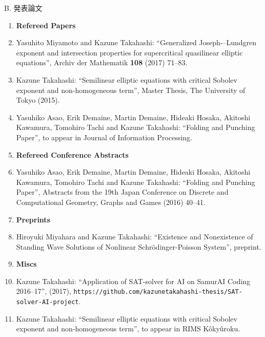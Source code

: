 \documentclass[a4j,twocolumn]{jarticle}
\begin{document}
\vspace{0.2cm}

\noindent B. 発表論文

\vspace{0.1cm}


\begin{enumerate}
 \item[] {\bf Refereed Papers}
 \item Yasuhito Miyamoto and Kazune Takahashi: ``Generalized
       Joseph-–Lundgren exponent and intersection properties for
       supercritical quasilinear elliptic equations'',
       Archiv der Mathematik {\bf 108} (2017) 71--83. 
 \item Kazune Takahashi: ``Semilinear elliptic equations with critical
       Sobolev exponent and non-homogeneous term'',
       Master Thesis, The University of Tokyo (2015).
 \item Yasuhiko Asao, Erik Demaine, Martin Demaine, Hideaki Hosaka,
       Akitoshi Kawamura, Tomohiro Tachi and Kazune Takahashi:
       ``Folding and Punching Paper'', to appear in
       Journal of Information Processing.
 \item[] {\bf Refereed Conference Abstracts}
 \item Yasuhiko Asao, Erik Demaine, Martin Demaine, Hideaki Hosaka,
       Akitoshi Kawamura, Tomohiro Tachi and Kazune Takahashi:
       ``Folding and Punching Paper'', Abstracts from the 19th Japan
       Conference on Discrete and Computational Geometry, Graphs and
       Games (2016) 40--41.
 \item[] {\bf Preprints}
 \item Hiroyuki Miyahara and Kazune Takahashi: ``Existence and
       Nonexistence of Standing Wave Solutions of 
       Nonlinear Schr\"{o}dinger-Poisson System'', preprint.
 \item[] {\bf Miscs}
 \item Kazune Takahashi: ``Application of SAT-solver for AI on SamurAI
       Coding 2016--17'', (2017),
       {\tt https:\slash\slash{}github.com\slash{}kazunetakahashi-thesis\slash{}SAT-solver-AI-project}.
 \item Kazune Takahashi: ``Semilinear elliptic equations with
       critical Sobolev exponent and non-homogeneous term'',
       to appear in RIMS K\^{o}ky\^{u}roku.
\end{enumerate}
\end{document}
